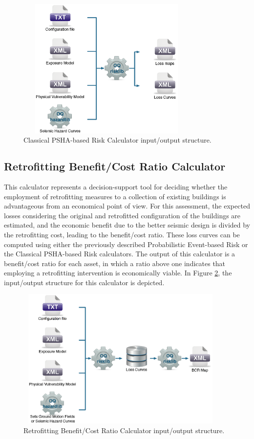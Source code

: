\begin{figure}[ht]
\centering
\includegraphics[width=9cm,height=7cm]{./figures/risk/ClassicalPSHA.eps}
\caption{Classical PSHA-based Risk Calculator input/output structure.}
\label{fig:ClassialPSHA}
\end{figure}

\subsection{Retrofitting Benefit/Cost Ratio Calculator}
This calculator represents a decision-support tool for deciding whether the employment of retrofitting measures to a collection of existing buildings is advantageous from an economical point of view. For this assessment, the expected losses considering the original and retrofitted configuration of the buildings are estimated, and the economic benefit due to the better seismic design is divided by the retrofitting cost, leading to the benefit/cost ratio. These loss curves can be computed using either the previously described Probabilistic Event-based Risk or the Classical PSHA-based Risk calculators. The output of this calculator is a benefit/cost ratio for each asset, in which a ratio above one indicates that employing  a retrofitting intervention is economically viable. In Figure \ref{fig:BCR}, the input/output structure for this calculator is depicted.

\begin{figure}[ht]
\centering
\includegraphics[width=10.5cm,height=7cm]{./figures/risk/BCR.eps}
\caption{Retrofitting Benefit/Cost Ratio Calculator input/output structure.}
\label{fig:BCR}
\end{figure}